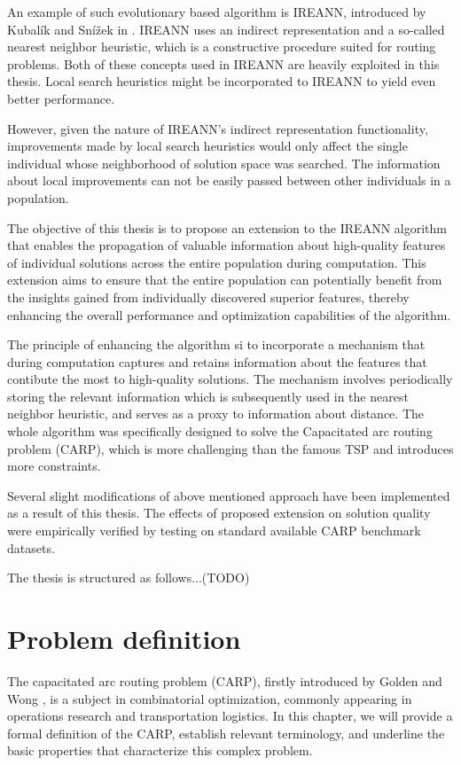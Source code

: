 \documentclass[twoside]{ctuthesis}
\theoremstyle{plain}
\theoremstyle{definition}
\theoremstyle{note}
\begin{document}
An example of such evolutionary based algorithm is IREANN, introduced by Kubalík and Snížek in \cite{kubalik2014novel}. IREANN uses an indirect representation and a so-called nearest neighbor heuristic, which is a constructive procedure suited for routing problems. Both of these concepts used in IREANN are heavily exploited in this thesis. Local search heuristics might be incorporated to IREANN to yield even better performance.

However, given the nature of IREANN's indirect representation functionality, improvements made by local search heuristics would only affect the single individual whose neighborhood of solution space was searched. The information about local improvements can not be easily passed between other individuals in a population. 

The objective of this thesis is to propose an extension to the IREANN algorithm that enables the propagation of valuable information about high-quality features of individual solutions across the entire population during computation. This extension aims to ensure that the entire population can potentially benefit from the insights gained from individually discovered superior features, thereby enhancing the overall performance and optimization capabilities of the algorithm.

The principle of enhancing the algorithm si to incorporate a mechanism that during computation captures and retains information about the features that contibute the most to high-quality solutions. The mechanism involves periodically storing the relevant information which is subsequently used in the nearest neighbor heuristic, and serves as a proxy to information about distance. The whole algorithm was specifically designed to solve the Capacitated arc routing problem (CARP), which is more challenging than the famous TSP and introduces more constraints.

Several slight modifications of above mentioned approach have been implemented as a result of this thesis. The effects of proposed extension on solution quality were empirically verified by testing on standard available CARP benchmark datasets.

The thesis is structured as follows...(TODO)

\chapter{Problem definition}
The capacitated arc routing problem (CARP), firstly introduced by Golden and Wong \cite{golden1981capacitated}, is a subject in combinatorial optimization, commonly appearing in operations research and transportation logistics. In this chapter, we will provide a formal definition of the CARP, establish relevant terminology, and underline the basic properties that characterize this complex problem.
\end{document}
